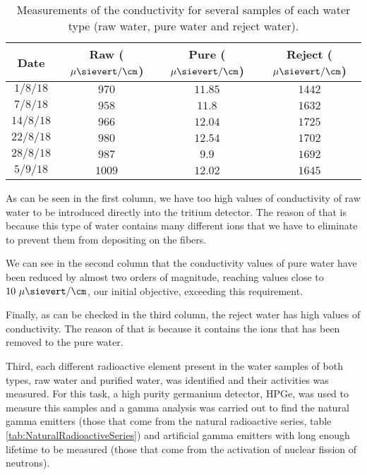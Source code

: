\begin{table}[htbp]
\begin{center}
\begin{tabular}{|c|c|c|c|}
\hline
Date & Raw ($\mu\sievert/\cm$) & Pure ($\mu\sievert/\cm$) & Reject ($\mu\sievert/\cm$) \\
\hline \hline \hline
$1/8/18$ & $970$ & $11.85$ & $1442$ \\ \hline
$7/8/18$ & $958$ & $11.8$ & $1632$ \\ \hline
$14/8/18$ & $966$ & $12.04$ & $1725$ \\ \hline
$22/8/18$ & $980$ & $12.54$ & $1702$ \\ \hline
$28/8/18$ & $987$ & $9.9$ & $1692$ \\ \hline
$5/9/18$ & $1009$ & $12.02$ & $1645$ \\ \hline
\end{tabular}
\caption{Measurements of the conductivity for several samples of each water type (raw water, pure water and reject water).}
\label{tab:ConductivityValues}
\end{center}
\end{table}	

As can be seen in the first column, we have too high values of conductivity of raw water to be introduced directly into the tritium detector. The reason of that is because this type of water contains many different ions that we have to eliminate to prevent them from depositing on the fibers.

We can see in the second column that the conductivity values of pure water have been reduced by almost two orders of magnitude, reaching values close to $10~\mu\sievert/\cm$, our initial objective, exceeding this requirement.

Finally, as can be checked in the third column, the reject water has high values of conductivity. The reason of that is because it contains the ions that has been removed to the pure water.

Third, each different radioactive element present in the water samples of both types, raw water and purified water, was identified and their activities was measured. For this task, a high purity germanium detector, HPGe, was used to measure this samples and a gamma analysis was carried out to find the natural gamma emitters (those that come from the natural radioactive series, table \ref{tab:NaturalRadioactiveSeries}) and artificial gamma emitters with long enough lifetime to be measured (those that come from the activation of nuclear fission of neutrons).

